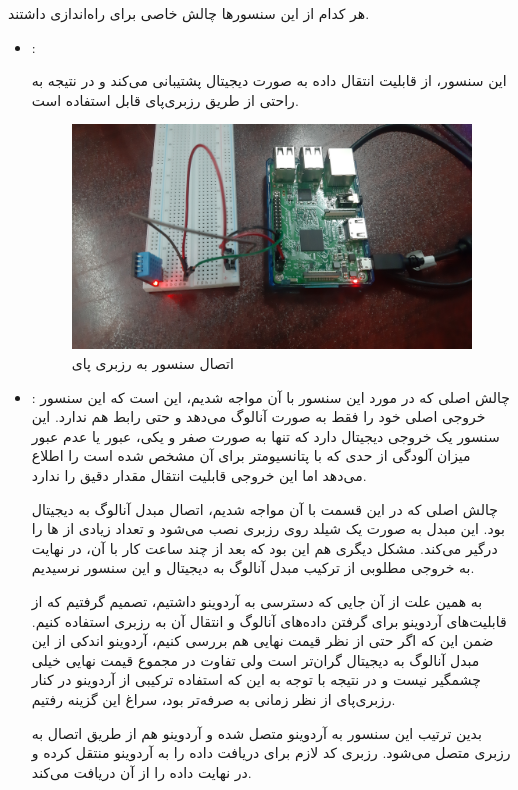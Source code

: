\documentclass[12pt]{article}
\begin{document}
هر کدام از این سنسورها چالش خاصی برای راه‌اندازی داشتند.

\begin{itemize}
	\item {}:
	
	این سنسور،‌ از قابلیت انتقال داده به صورت دیجیتال پشتیبانی می‌کند و در نتیجه به راحتی از طریق رزبری‌پای قابل استفاده است. 
	\begin{figure}[H]
		\begin{center}
			\includegraphics[width=.70\textwidth]{images/dht11.jpg}
		\end{center}
		\caption{اتصال سنسور   به رزبری پای}
	\end{figure}
	
	\item {}:
	چالش اصلی که در مورد این سنسور با آن مواجه شدیم، این است که این سنسور خروجی اصلی خود را فقط به صورت آنالوگ می‌دهد و حتی رابط  هم ندارد. این سنسور یک خروجی دیجیتال دارد که تنها به صورت صفر و یکی، عبور یا عدم عبور میزان آلودگی از حدی که با پتانسیومتر برای آن مشخص شده است را اطلاع می‌دهد اما این خروجی قابلیت انتقال مقدار دقیق را ندارد.
	
	چالش اصلی که در این قسمت با آن مواجه شدیم، اتصال مبدل آنالوگ به دیجیتال بود. این مبدل به صورت یک شیلد روی رزبری نصب می‌شود و تعداد زیادی از  ‌ها را درگیر می‌کند. مشکل دیگری هم این بود که بعد از چند ساعت کار با آن، در نهایت به خروجی مطلوبی از ترکیب مبدل آنالوگ به دیجیتال و این سنسور نرسیدیم.
	
	به همین علت از آن جایی که دسترسی به آردوینو  داشتیم، تصمیم گرفتیم که از قابلیت‌های آردوینو برای گرفتن داده‌های آنالوگ و انتقال آن به رزبری استفاده کنیم. ضمن این که اگر حتی از نظر قیمت‌ نهایی هم بررسی کنیم، آردوینو اندکی از این مبدل آنالوگ به دیجیتال گران‌تر است ولی تفاوت در مجموع قیمت نهایی خیلی چشمگیر نیست و در نتیجه با توجه به این که استفاده ترکیبی از آردوینو در کنار رزبری‌پای از نظر زمانی به صرفه‌تر بود، سراغ این گزینه رفتیم.
	
	بدین ترتیب این سنسور به آردوینو متصل شده و آردوینو هم از طریق اتصال  به رزبری متصل می‌شود. رزبری کد لازم برای دریافت داده را به آردوینو منتقل کرده و در نهایت داده را از آن دریافت می‌کند.
	

\end{itemize}
\end{document}
